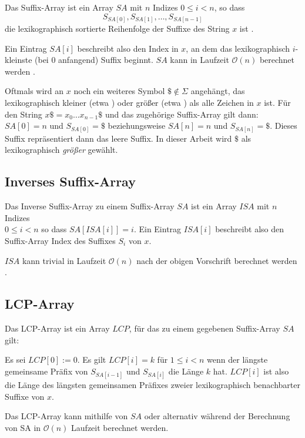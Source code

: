 Das Suffix-Array ist ein Array $SA$ mit $n$ Indizes $0 \leq i < n$, so dass 
\begin{equation*}
	S_{SA[0]}, S_{SA[1]}, \dots, S_{SA[n-1]}
\end{equation*}
die lexikographisch sortierte Reihenfolge der Suffixe des String $x$ ist \cite{abouelhoda_replacing_2004, manber_suffix_1993}.

Ein Eintrag $SA[i]$ beschreibt also den Index in $x$, an dem das lexikographisch $i$-kleinste (bei $0$ anfangend) Suffix beginnt. $SA$ kann in Laufzeit $\mathcal{O}(n)$ berechnet werden \cite{nong_two_2011}. 

Oftmals wird an $x$ noch ein weiteres Symbol $\$ \notin \Sigma$ angehängt, das lexikographisch kleiner (etwa \cite{fischer_inducing_2011, nong_two_2011}) oder größer (etwa \cite{abouelhoda_optimal_2002}) als alle Zeichen in $x$ ist. Für den String $x\$ = x_0\dots x_{n-1} \$$ und das zugehörige Suffix-Array gilt dann: $SA[0] = n$ und $S_{SA[0]} = \$$ beziehungsweise $SA[n] = n$ und $S_{SA[n]} = \$$. 
Dieses Suffix repräsentiert dann das leere Suffix. In dieser Arbeit wird $\$$ als lexikographisch \textit{größer} gewählt.

\subsection{Inverses Suffix-Array}

Das Inverse Suffix-Array zu einem Suffix-Array $SA$ ist ein Array $ISA$ mit $n$ Indizes \\
$0 \leq i < n$ so dass $SA[ISA[i]] = i$.
Ein Eintrag $ISA[i]$ beschreibt also den Suffix-Array Index des Suffixes $S_i$ von $x$.

$ISA$ kann trivial in Laufzeit $\mathcal{O}(n)$ nach der obigen Vorschrift berechnet werden \cite{abouelhoda_replacing_2004}.

\subsection{LCP-Array}

Das LCP-Array ist ein Array $LCP$, für das zu einem gegebenen Suffix-Array $SA$ gilt: 

Es sei $LCP[0] := 0$. Es gilt $LCP[i] = k$ für $1 \leq i < n$ wenn der längste gemeinsame Präfix von $S_{SA[i-1]}$ und $S_{SA[i]}$ die Länge $k$ hat. $LCP[i]$ ist also die Länge des längsten gemeinsamen Präfixes zweier lexikographisch benachbarter Suffixe von $x$. 

Das LCP-Array kann mithilfe von $SA$ \cite{kasai_linear-time_2001} oder alternativ während der Berechnung von SA \cite{fischer_inducing_2011} in $\mathcal{O}(n)$ Laufzeit berechnet werden.

